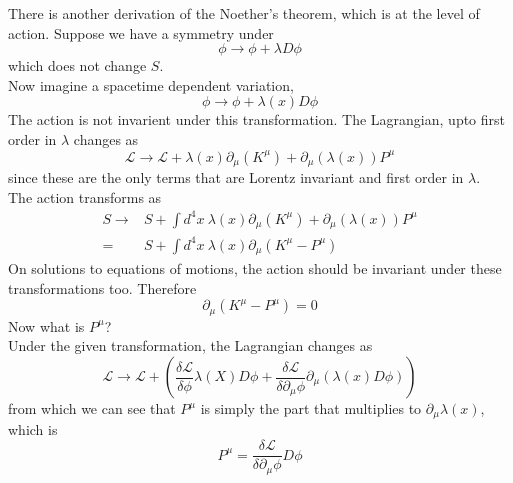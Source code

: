 \documentclass[11pt]{article}
\newcommand{\del}{\partial}
\newcommand{\ld}{\mathcal{L}}
\numberwithin{equation}{section}
\begin{document}
    There is another derivation of the Noether's theorem, which is at the level of action. Suppose we have a symmetry under 
    \begin{equation*}
        \phi \to \phi + \lambda D\phi
    \end{equation*}
    which does not change \(S\).\\
    Now imagine a spacetime dependent variation, 
    \begin{equation*}
        \phi \to \phi + \lambda(x) D\phi
    \end{equation*}
    The action is not invarient under this transformation. The Lagrangian, upto first order in \(\lambda\) changes as 
    \begin{equation*}
        \ld \to \ld + \lambda(x) \del_\mu(K^\mu) + \del_\mu(\lambda(x)) P^\mu
    \end{equation*}
    since these are the only terms that are Lorentz invariant and first order in \(\lambda\).\\
    The action transforms as 
    \begin{align*}
        S \to &S + \int d^4x~ \lambda(x) \del_\mu(K^\mu) + \del_\mu(\lambda(x)) P^\mu\\
        = & S + \int d^4x ~ \lambda(x) \del_\mu (K^\mu - P^\mu)
    \end{align*}
    On solutions to equations of motions, the action should be invariant under these transformations too. Therefore 
    \begin{equation*}
        \del_\mu (K^\mu - P^\mu) = 0
    \end{equation*}
    Now what is \(P^\mu\)? \\
    Under the given transformation, the Lagrangian changes as 
    \begin{equation*}
        \ld \to \ld + \left( \frac{\delta \ld}{\delta \phi}\lambda(X) D\phi +  \frac{\delta \ld}{\delta \del_\mu \phi} \del_\mu(\lambda(x) D\phi) \right)
    \end{equation*}
    from which we can see that \(P^\mu\) is simply the part that multiplies to \(\del_\mu \lambda(x)\), which is 
    \begin{equation*}
        P^\mu = \frac{\delta \ld}{\delta \del_\mu \phi} D\phi
    \end{equation*}

\end{document}
